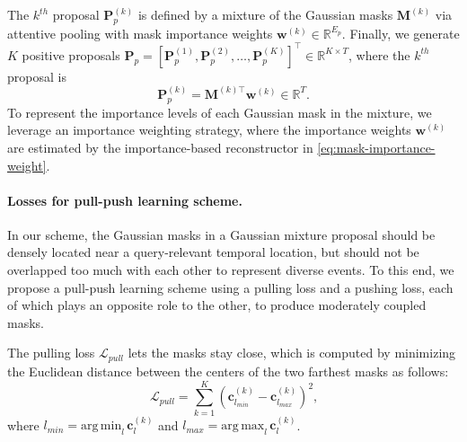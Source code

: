 The $k^{th}$ proposal $\mathbf{P}_{p}^{(k)}$ is defined by a mixture of the Gaussian masks $\mathbf{M}^{(k)}$ via attentive pooling with mask importance weights $\mathbf{w}^{(k)}\in\mathbb{R}^{E_p}$. 
Finally, we generate $K$ positive proposals $\mathbf{P}_{p} = [ \mathbf{P}_{p}^{(1)}, \mathbf{P}_{p}^{(2)}, \dots, \mathbf{P}_{p}^{(K)} ]^\top \in \mathbb{R}^{K\times T}$, where the $k^{th}$ proposal is
\begin{equation}
  \mathbf{P}_{p}^{(k)} = \mathbf{M}^{(k)\top}\mathbf{w}^{(k)} \in \mathbb{R}^{T} \text{.}
  \label{eq:gaussian-mixture-proposal}
\end{equation}
To represent the importance levels of each Gaussian mask in the mixture, we leverage an importance weighting strategy, where the importance weights $\mathbf{w}^{(k)}$ are estimated by the importance-based reconstructor in \cref{eq:mask-importance-weight}.


\paragraph{Losses for pull-push learning scheme.}
In our scheme, the Gaussian masks in a Gaussian mixture proposal should be densely located near a query-relevant temporal location, but should not be overlapped too much with each other to represent diverse events.
To this end, we propose a pull-push learning scheme using a pulling loss and a pushing loss, each of which plays an opposite role to the other, to produce moderately coupled masks.

The pulling loss $\mathcal{L}_{pull}$ lets the masks stay close, which is computed by minimizing the Euclidean distance between the centers of the two farthest masks as follows:
\begin{equation}
  \mathcal{L}_{pull} = \sum_{k=1}^K \left(\mathbf{c}^{(k)}_{l_{min}} - \mathbf{c}^{(k)}_{l_{max}}\right)^2 \text{,}
  \label{eq:pulling-loss}
\end{equation}
where $l_{min}=\mathrm{arg\,min}_l\, \mathbf{c}^{(k)}_{l}$ and $l_{max}=\mathrm{arg\,max}_l\, \mathbf{c}^{(k)}_{l}$.

